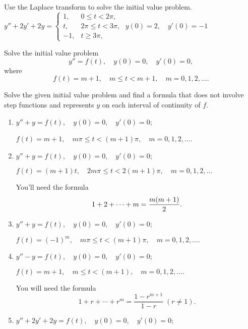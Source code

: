 \documentclass{ximera}
\begin{document}
\begin{problem}\label{exer:8.5.20} Use the Laplace transform to solve the initial value problem.
$y''+2y'+2y=\left\{\begin{array}{rl}1,&0\le
t<2\pi,\\t,&2\pi\le t<3\pi,\\-1,&t\ge 3\pi,\end{array}\right.\;
y(0)=2,\quad y'(0)=-1$
\end{problem}

\begin{problem}\label{exer:8.5.21} Solve the initial value problem $$ y''=f(t), \quad
y(0)=0,\quad  y'(0)=0, $$ where $$ f(t)=m+1,\quad m\le t<m+1,\quad
m=0,1,2,\dots. $$
\end{problem}

\begin{problem}\label{exer:8.5.22} Solve the given initial value problem and find a
formula that does not involve step functions and represents $y$ on
each interval of continuity of $f$.
\begin{enumerate}
\item %
$y''+y=f(t), \quad  y(0)=0,\quad  y'(0)=0$;

$f(t)=m+1,\quad  m\pi\le t<(m+1)\pi,\quad m=0,1,2,\dots$.

\item %
$y''+y=f(t), \quad  y(0)=0,\quad y'(0)=0$;

$f(t)=(m+1)t, \quad   2m\pi\le t<2(m+1)\pi,\quad m=0,1,2,\dots$

\begin{hint}
You'll need the formula
$$
1+2+\cdots+m={m(m+1)\over2}.
$$  
\end{hint}

\item %
$y''+y=f(t), \quad  y(0)=0,\quad  y'(0)=0$;

$f(t)=(-1)^m,\quad  m\pi\le t<(m+1)\pi,\quad m=0,1,2,\dots.$

\item %
$y''-y=f(t), \quad  y(0)=0,\quad  y'(0)=0$;

$f(t)=m+1,\quad  m\le t<(m+1),\quad m=0,1,2,\dots.$

\begin{hint}
You will need the formula
$$
1+r+\cdots+r^m=\frac{1-r^{m+1}}{1-r}\; (r\ne1).
$$
\end{hint}

\item %
$y''+2y'+2y=f(t), \quad  y(0)=0,\quad  y'(0)=0$;


\end{enumerate}
\end{problem}
\end{document}
